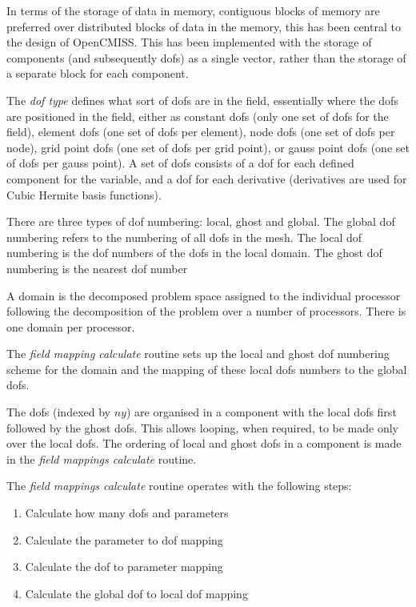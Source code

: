 In terms of the storage of data in memory, contiguous blocks of memory are 
preferred over distributed blocks of data in the memory, this has been central 
to the design of OpenCMISS. This has been implemented with the storage of 
components (and subsequently dofs) as a single vector, rather than the storage 
of a separate block for each component.

The \emph{dof type} defines what sort of dofs are in the field, essentially
where the dofs are positioned in the field, either as constant dofs (only one 
set of dofs for the field), element dofs (one set of dofs per element), node 
dofs (one set of dofs per node), grid point dofs (one set of dofs per grid point), 
or gauss point dofs (one set of dofs per gauss point). A set of dofs consists of 
a dof for each defined component for the variable, and a dof for each derivative 
(derivatives are used for Cubic Hermite basis functions).

There are three types of dof numbering: local, ghost and global. The global dof 
numbering refers to the numbering of all dofs in the mesh. The local dof
numbering is the dof numbers of the dofs in the local domain. The ghost dof 
numbering is the nearest dof number 

A domain is the decomposed problem space assigned to the individual processor 
following the decomposition of the problem over a number of processors. There
is one domain per processor. 

The \emph{field mapping calculate} routine sets up the local and ghost dof
numbering scheme for the domain and the mapping of these local dofs numbers 
to the global dofs.

The dofs (indexed by $ny$) are organised in a component with the local dofs
first followed by the ghost dofs. This allows looping, when required, to be made 
only over the local dofs. The ordering of local and ghost dofs in a component is
made in the \emph{field mappings calculate} routine.

The \emph{field mappings calculate} routine operates with the following steps:

\begin{enumerate}
 \item Calculate how many dofs and parameters
 \item Calculate the parameter to dof mapping
 \item Calculate the dof to parameter mapping
 \item Calculate the global dof to local dof mapping
\end{enumerate}

